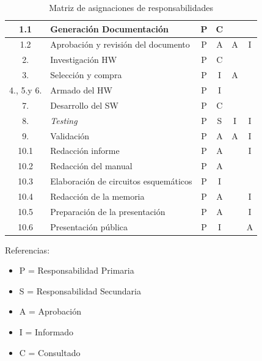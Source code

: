 \documentclass[11pt]{charter}
\begin{document}
\begin{table}[htbp]
\begin{tabularx}{\textwidth}{@{}|c|p{11em}|p{5.8em}|p{4.8em}|p{6em}|X|@{}}
\hline \rowcolor[gray]{.8}
1.1 & Generación Documentación & \multicolumn{1}{c|}{P} & \multicolumn{1}{c|}{C} & &  \\
\hline 
1.2 & Aprobación y revisión del documento &\multicolumn{1}{c|}{P} &\multicolumn{1}{c|}{A}& \multicolumn{1}{c|}{A} &\multicolumn{1}{c|}{I} \\
\hline \rowcolor[gray]{.8}
2. & Investigación HW &\multicolumn{1}{c|}{P} & \multicolumn{1}{c|}{C} &   &  \\
\hline
3. & Selección y compra &\multicolumn{1}{c|}{P} &\multicolumn{1}{c|}{I} &\multicolumn{1}{c|}{A} &  \\
\hline \rowcolor[gray]{.8}
4., 5.y 6. & Armado del HW &\multicolumn{1}{c|}{P} &\multicolumn{1}{c|}{I}  &   &  \\
\hline
7. & Desarrollo del SW &\multicolumn{1}{c|}{P} &\multicolumn{1}{c|}{C} & & \\
\hline \rowcolor[gray]{.8}
8. & \textit{Testing} &\multicolumn{1}{c|}{P} &\multicolumn{1}{c|}{S} &\multicolumn{1}{c|}{I} &\multicolumn{1}{c|}{I}\\
\hline
9. &  Validación &\multicolumn{1}{c|}{P} &\multicolumn{1}{c|}{A} &\multicolumn{1}{c|}{A} &\multicolumn{1}{c|}{I} \\
\hline \rowcolor[gray]{.8}
10.1 & Redacción informe &\multicolumn{1}{c|}{P} &\multicolumn{1}{c|}{A} &  &\multicolumn{1}{c|}{I} \\
\hline
10.2 & Redacción del manual &\multicolumn{1}{c|}{P} &\multicolumn{1}{c|}{A} &   &  \\
\hline \rowcolor[gray]{.8}
10.3 & Elaboración de circuitos esquemáticos &\multicolumn{1}{c|}{P} &  \multicolumn{1}{c|}{I} &   & \\
\hline
10.4 & Redacción de la memoria &\multicolumn{1}{c|}{P}  &\multicolumn{1}{c|}{A} &   &\multicolumn{1}{c|}{I} \\
\hline \rowcolor[gray]{.8}
10.5 & Preparación de la presentación &\multicolumn{1}{c|}{P}  &\multicolumn{1}{c|}{A} &  &\multicolumn{1}{c|}{I} \\
\hline
10.6 & Presentación pública &\multicolumn{1}{c|}{P} &\multicolumn{1}{c|}{I} &  & \multicolumn{1}{c|}{A} \\
\hline 
\end{tabularx}%
\caption{Matriz de asignaciones de responsabilidades}
\label{tab:addlabel}
\end{table}

{\footnotesize
Referencias:
\begin{itemize}
	\item P = Responsabilidad Primaria
	\item S = Responsabilidad Secundaria
	\item A = Aprobación
	\item I = Informado
	\item C = Consultado
\end{itemize}
} %
\end{document}
